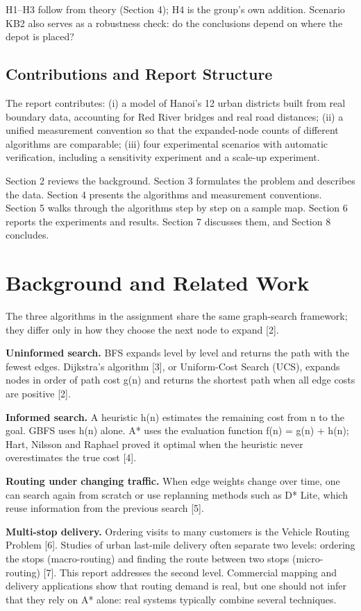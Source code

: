 \documentclass[12pt,a4paper]{article}
\begin{document}
H1--H3 follow from theory (Section 4); H4 is the group's own
addition. Scenario KB2 also serves as a robustness check: do
the conclusions depend on where the depot is placed?

\subsection{Contributions and Report Structure}

The report contributes: (i) a model of Hanoi's 12 urban
districts built from real boundary data, accounting for Red
River bridges and real road distances; (ii) a unified
measurement convention so that the expanded-node counts of
different algorithms are comparable; (iii) four experimental
scenarios with automatic verification, including a
sensitivity experiment and a scale-up experiment.

Section 2 reviews the background. Section 3 formulates the
problem and describes the data. Section 4 presents the
algorithms and measurement conventions. Section 5 walks
through the algorithms step by step on a sample map. Section
6 reports the experiments and results. Section 7 discusses
them, and Section 8 concludes.

\section{Background and Related Work}

The three algorithms in the assignment share the same
graph-search framework; they differ only in how they choose
the next node to expand {[}2{]}.

\textbf{Uninformed search.} BFS expands level by level and
returns the path with the fewest edges. Dijkstra's algorithm
{[}3{]}, or Uniform-Cost Search (UCS), expands nodes in
order of path cost g(n) and returns the shortest path when
all edge costs are positive {[}2{]}.

\textbf{Informed search.} A heuristic h(n) estimates the
remaining cost from n to the goal. GBFS uses h(n) alone. A*
uses the evaluation function f(n) = g(n) + h(n); Hart,
Nilsson and Raphael proved it optimal when the heuristic
never overestimates the true cost {[}4{]}.

\textbf{Routing under changing traffic.} When edge weights
change over time, one can search again from scratch or use
replanning methods such as D* Lite, which reuse information
from the previous search {[}5{]}.

\textbf{Multi-stop delivery.} Ordering visits to many
customers is the Vehicle Routing Problem {[}6{]}. Studies of
urban last-mile delivery often separate two levels: ordering
the stops (macro-routing) and finding the route between two
stops (micro-routing) {[}7{]}. This report addresses the
second level. Commercial mapping and delivery applications
show that routing demand is real, but one should not infer
that they rely on A* alone: real systems typically combine
several techniques.
\end{document}
